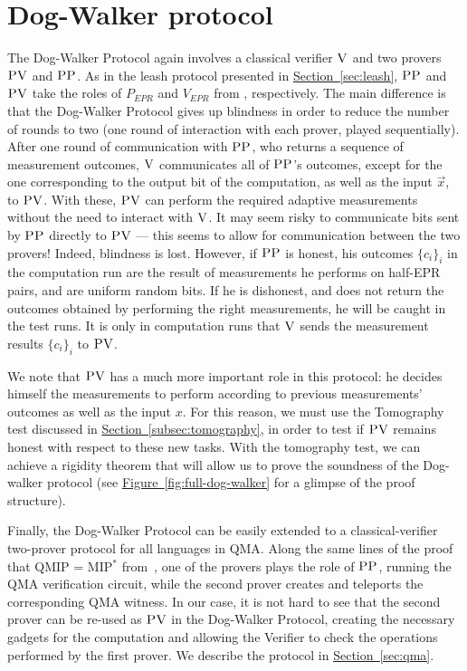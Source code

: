 \documentclass[11pt]{article}
\numberwithin{equation}{section}
\theoremstyle{definition}
\theoremstyle{plain}
\newcommand{\expref}[2]{\hyperref[#2]{#1~\ref{#2}}}
\newcommand{\ver}{\textsc{V}}
\newcommand{\pv}{\textsc{PV}}
\newcommand{\pp}{\textsc{PP}}
\begin{document}
\section{Dog-Walker protocol}
\label{sec:dog-walker}
The Dog-Walker Protocol again involves a classical verifier $\ver$ and two provers $\pv$ and $\pp$. As in the leash protocol presented in \expref{Section}{sec:leash}, $\pp$ and $\pv$ take the roles of $P_{EPR}$ and $V_{EPR}$ from \cite{broadbent15howtoverify}, respectively. %
The main difference is that the Dog-Walker Protocol gives up blindness in order to reduce the number of rounds to two (one round of interaction with each prover, played sequentially). After 
one
round of communication with $\pp$, who returns a sequence of measurement outcomes, $\ver$ communicates all of $\pp$'s outcomes, except for the one corresponding to the output bit of the computation, as well as the input 
$\vec{x}$,
to $\pv$.  
With 
these, $\pv$ can perform the required adaptive measurements without the need to interact with 
$\ver$.
It may seem risky to communicate bits sent by $\pp$ directly to $\pv$ --- this seems to allow for communication between the two provers! Indeed, blindness is lost. However, if $\pp$ is honest, his outcomes $\{c_i\}_i$ in the computation run are the result of measurements he performs on half-EPR pairs, and are uniform random bits. If he is dishonest, and does not return the outcomes  obtained by performing the right measurements, he will be caught in the test runs. It is only in computation runs that $\ver$ sends the measurement results $\{c_i\}_i$ to $\pv$. 

We note that $\pv$ has a much more important role in this protocol: he
decides himself the measurements to perform according to previous measurements'
outcomes as well as the input $x$. For this reason, we must use the Tomography test
discussed in \expref{Section}{subsec:tomography}, in order to test if $\pv$ remains
honest with respect to these new tasks.  With the tomography test, we can achieve a
rigidity theorem that will allow us to prove the soundness of the Dog-walker
protocol
(see \expref{Figure}{fig:full-dog-walker} for a glimpse of the proof
structure).


Finally, the Dog-Walker Protocol can be easily extended to a classical-verifier  two-prover protocol for all languages in QMA. 
Along the same lines of the proof that QMIP = MIP$^*$ from~\cite{reichardt2012classical}, one of the provers plays the role of $\pp$, running the  QMA verification circuit, while the second prover creates and teleports the corresponding QMA witness. In our case, it is not hard to see that the second prover can be  re-used as $\pv$ in the Dog-Walker Protocol, creating the necessary gadgets for the computation and allowing the Verifier to check the operations performed by the first prover.  We describe the protocol in \expref{Section}{sec:qma}.
\end{document}
